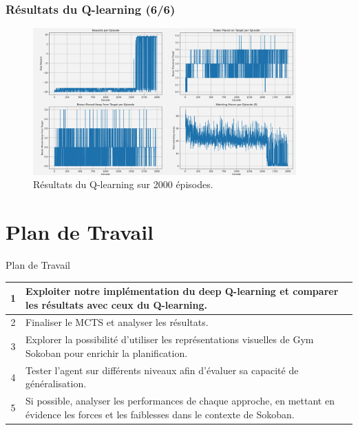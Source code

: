 \documentclass[
	11pt, %
]{beamer}
\begin{document}
\begin{frame}
    \frametitle{Résultats du Q-learning (6/6)}
    \begin{figure}
        \centering
        \includegraphics[width=0.9\textwidth]{Images/resultat_2000.png}
		\caption{Résultats du Q-learning sur 2000 épisodes.}
    \end{figure}
\end{frame}


\section{Plan de Travail}

\begin{frame}{Plan de Travail}
    \begin{table}
        \centering
		\small
        \begin{tabular}{|c|p{8cm}|}
			\hline
            1 & Exploiter notre implémentation du deep Q-learning et comparer les résultats avec ceux du Q-learning.  \\
            \hline
            2 & Finaliser le MCTS et analyser les résultats.  \\
            \hline
            3 & Explorer la possibilité d'utiliser les représentations visuelles de Gym Sokoban pour enrichir la planification. \\
            \hline
            4 & Tester l'agent sur différents niveaux afin d'évaluer sa capacité de généralisation. \\
            \hline
            5 & Si possible, analyser les performances de chaque approche, en mettant en évidence les forces et les faiblesses dans le contexte de Sokoban. \\
            \hline
        \end{tabular}
    \end{table}
\end{frame}
\end{document}
